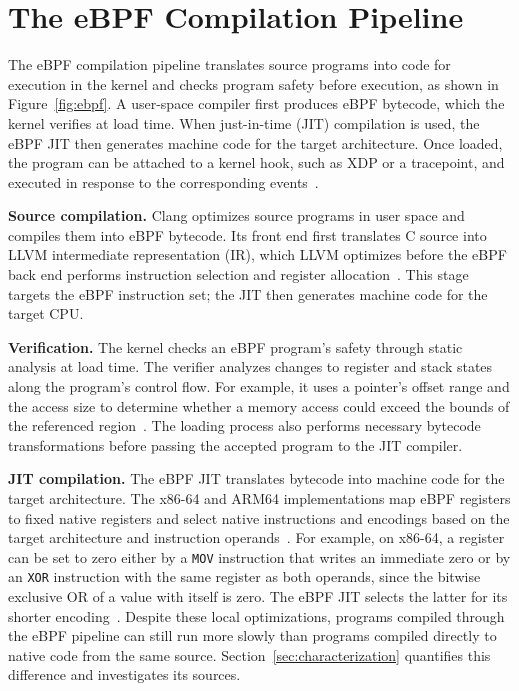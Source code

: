 \section{The eBPF Compilation Pipeline}
\label{sec:background}

The eBPF compilation pipeline translates source programs into code for execution in the kernel and checks program safety before execution, as shown in Figure~\ref{fig:ebpf}. A user-space compiler first produces eBPF bytecode, which the kernel verifies at load time. When just-in-time (JIT) compilation is used, the eBPF JIT then generates machine code for the target architecture. Once loaded, the program can be attached to a kernel hook, such as XDP or a tracepoint, and executed in response to the corresponding events~\cite{linuxndlibbpf}.



\noindent\textbf{Source compilation.}
Clang optimizes source programs in user space and compiles them into eBPF bytecode. Its front end first translates C source into LLVM intermediate representation (IR), which LLVM optimizes before the eBPF back end performs instruction selection and register allocation~\cite{llvmndcodegenerator}. This stage targets the eBPF instruction set; the JIT then generates machine code for the target CPU.

\noindent\textbf{Verification.}
The kernel checks an eBPF program's safety through static analysis at load time. The verifier analyzes changes to register and stack states along the program's control flow. For example, it uses a pointer's offset range and the access size to determine whether a memory access could exceed the bounds of the referenced region~\cite{verifier}. The loading process also performs necessary bytecode transformations before passing the accepted program to the JIT compiler.

\noindent\textbf{JIT compilation.}
The eBPF JIT translates bytecode into machine code for the target architecture. The x86-64 and ARM64 implementations map eBPF registers to fixed native registers and select native instructions and encodings based on the target architecture and instruction operands~\cite{linux_bpf_jit,linuxndarm64jit}. For example, on x86-64, a register can be set to zero either by a \texttt{MOV} instruction that writes an immediate zero or by an \texttt{XOR} instruction with the same register as both operands, since the bitwise exclusive OR of a value with itself is zero. The eBPF JIT selects the latter for its shorter encoding~\cite{linux_bpf_jit}. Despite these local optimizations, programs compiled through the eBPF pipeline can still run more slowly than programs compiled directly to native code from the same source. Section~\ref{sec:characterization} quantifies this difference and investigates its sources.